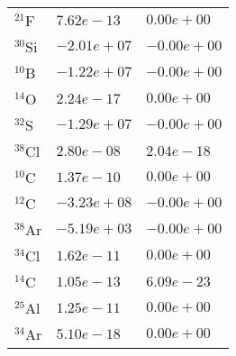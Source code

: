 \begin{tabular}{lll}
 $^{21}$F  & $7.62e-13 $                                                        & $0.00e+00 $                                                                     \\
 $^{30}$Si & $-2.01e+07 $                                                       & $-0.00e+00 $                                                                    \\
 $^{10}$B  & $-1.22e+07 $                                                       & $-0.00e+00 $                                                                    \\
 $^{14}$O  & $2.24e-17 $                                                        & $0.00e+00 $                                                                     \\
 $^{32}$S  & $-1.29e+07 $                                                       & $-0.00e+00 $                                                                    \\
 $^{38}$Cl & $2.80e-08 $                                                        & $2.04e-18 $                                                                     \\
 $^{10}$C  & $1.37e-10 $                                                        & $0.00e+00 $                                                                     \\
 $^{12}$C  & $-3.23e+08 $                                                       & $-0.00e+00 $                                                                    \\
 $^{38}$Ar & $-5.19e+03 $                                                       & $-0.00e+00 $                                                                    \\
 $^{34}$Cl & $1.62e-11 $                                                        & $0.00e+00 $                                                                     \\
 $^{14}$C  & $1.05e-13 $                                                        & $6.09e-23 $                                                                     \\
 $^{25}$Al & $1.25e-11 $                                                        & $0.00e+00 $                                                                     \\
 $^{34}$Ar & $5.10e-18 $                                                        & $0.00e+00 $                                                                     \\

\end{tabular}
